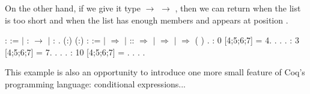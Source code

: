 \documentclass[12pt]{report}
\begin{document}
 On the other hand, if we give it type  \ensuremath{\rightarrow}  \ensuremath{\rightarrow}
    , then we can return  when the list is too short
    and   when the list has enough members and  appears at
    position . \begin{coqdoccode}
\coqdocemptyline
\coqdocnoindent
{}  :  :=\coqdoceol
\coqdocindent{1.00em}
\ensuremath{|}  :  \ensuremath{\rightarrow} \coqdoceol
\coqdocindent{1.00em}
\ensuremath{|}  : .\coqdoceol
\coqdocemptyline
\coqdocnoindent
{}  (:) (:) :  :=\coqdoceol
\coqdocindent{1.00em}
  \coqdoceol
\coqdocindent{1.00em}
\ensuremath{|}  \ensuremath{\Rightarrow}  \coqdoceol
\coqdocindent{1.00em}
\ensuremath{|}  ::  \ensuremath{\Rightarrow}      \coqdoceol
\coqdocindent{7.50em}
\ensuremath{|}  \ensuremath{\Rightarrow}  \coqdoceol
\coqdocindent{7.50em}
\ensuremath{|}  \ensuremath{\Rightarrow}  ( )  \coqdoceol
\coqdocindent{7.50em}
\coqdoceol
\coqdocindent{1.00em}
.\coqdoceol
\coqdocemptyline
\coqdocnoindent
{}  :     0 [4;5;6;7]  =  4.\coqdoceol
\coqdocnoindent
{}. . .\coqdoceol
\coqdocnoindent
{}  :     3 [4;5;6;7]  =  7.\coqdoceol
\coqdocnoindent
{}. . .\coqdoceol
\coqdocnoindent
{}  :     10 [4;5;6;7] = .\coqdoceol
\coqdocnoindent
{}. . .\coqdoceol
\coqdocemptyline
\end{coqdoccode}
This example is also an opportunity to introduce one more
    small feature of Coq's programming language: conditional
    expressions... 

\subsubsection{ }
\end{document}
